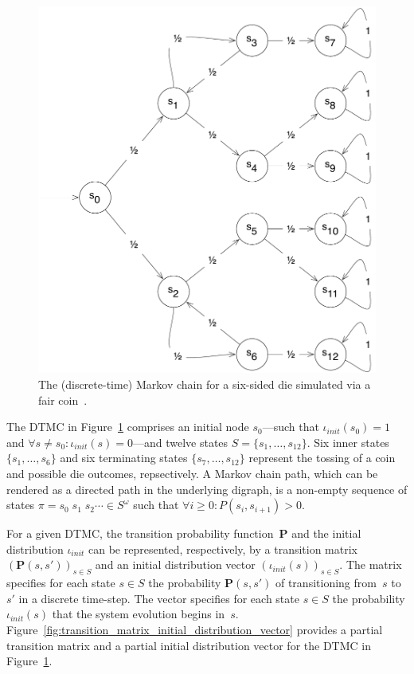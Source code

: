 \begin{figure}[ht]
\centering
\includegraphics[scale=0.58]{img/example-DTMC.pdf}
\caption[A discrete-time Markov chain example]{The (discrete-time) Markov chain for a six-sided die simulated via a fair coin~\cite{Baier_2008}.}
\label{fig:example_DTMC}
\end{figure}

The DTMC in Figure~\ref{fig:example_DTMC} comprises an initial node $s_0$---such that $\iota_{init}(s_0) = 1$ and $\forall s \neq s_0: \iota_{init}(s) = 0$---and twelve states $S = \{s_1,\ldots,s_{12}\}$. Six inner states $\{s_1,\ldots,s_6\}$ and six terminating states $\{s_7,\ldots,s_{12}\}$ represent the tossing of a coin and possible die outcomes, repsectively. A Markov chain path, which can be rendered as a directed path in the underlying digraph, is a non-empty sequence of states $\pi = s_0\;s_1\;s_2 \cdots \in S^\omega$ such that $\forall i \ge 0: P(s_i, s_{i+1}) > 0$.

For a given DTMC, the transition probability function~$\mathbf{P}$ and the initial distribution $\iota_{init}$ can be represented, respectively, by a transition matrix $\left(\mathbf{P}(s, s')\right)_{s \in S}$ and an initial distribution vector $\left(\iota_{init}(s)\right)_{s \in S}$. The matrix specifies for each state $s \in S$ the probability $\mathbf{P}(s, s')$ of transitioning from~$s$ to~$s'$ in a discrete time-step. The vector specifies for each state $s \in S$ the probability $\iota_{init}(s)$ that the system evolution begins in~$s$. Figure~\ref{fig:transition_matrix_initial_distribution_vector} provides a partial transition matrix and a partial initial distribution vector for the DTMC in Figure~\ref{fig:example_DTMC}.

